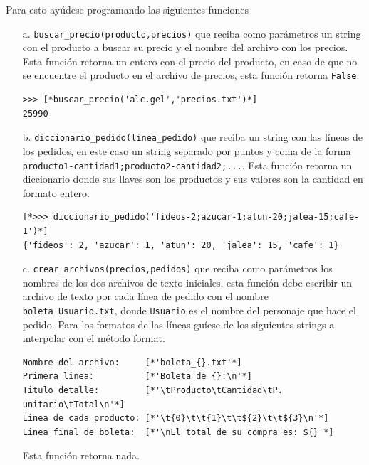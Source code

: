 Para esto ayúdese programando las siguientes funciones
\begin{itemize}
    \item[a.] \texttt{buscar\_precio(producto,precios)} que reciba como parámetros un string con el producto a buscar su precio y el nombre del archivo con los precios. Esta función retorna un entero con el precio del producto, en caso de que no se encuentre el producto en el archivo de precios, esta función retorna \texttt{False}.
    \begin{lstlisting}[style=consola]
>>> [*buscar_precio('alc.gel','precios.txt')*]
25990
    \end{lstlisting}
    \item[b.] \texttt{diccionario\_pedido(linea\_pedido)} que reciba un string con las líneas de los pedidos, en este caso un string separado por puntos y coma de la forma \texttt{producto1-cantidad1;producto2-cantidad2;...}. Esta función retorna un diccionario donde sus llaves son los productos y sus valores son la cantidad en formato entero.
\begin{lstlisting}[style=consola]
[*>>> diccionario_pedido('fideos-2;azucar-1;atun-20;jalea-15;cafe-1')*]
{'fideos': 2, 'azucar': 1, 'atun': 20, 'jalea': 15, 'cafe': 1}
\end{lstlisting}
    
    \item[c.] \texttt{crear\_archivos(precios,pedidos)} que reciba como parámetros los nombres de los dos archivos de texto iniciales, esta función debe escribir un archivo de texto por cada línea de pedido con el nombre \texttt{boleta\_Usuario.txt}, donde \texttt{Usuario} es el nombre del personaje que hace el pedido. Para los formatos de las líneas guíese de los siguientes strings a interpolar con el método format.
    \begin{lstlisting}[style=consola]
Nombre del archivo:     [*'boleta_{}.txt'*]
Primera linea:          [*'Boleta de {}:\n'*]
Titulo detalle:         [*'\tProducto\tCantidad\tP. unitario\tTotal\n'*]
Linea de cada producto: [*'\t{0}\t\t{1}\t\t${2}\t\t${3}\n'*]
Linea final de boleta:  [*'\nEl total de su compra es: ${}'*]
    \end{lstlisting}
    Esta función retorna nada.
\end{itemize}


